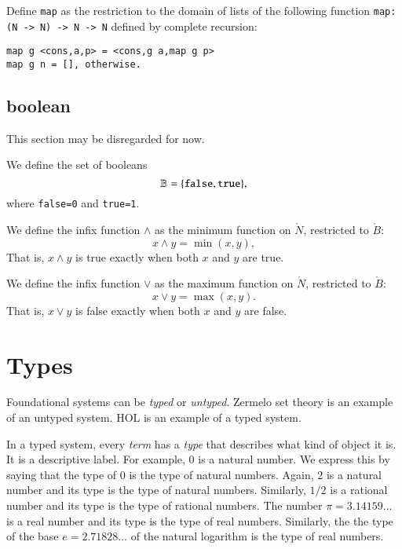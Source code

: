 \begin{example}  Define \verb!map! as the restriction to the domain of lists of the following function \verb!map:(N -> N) -> N -> N! defined by complete recursion:
\begin{verbatim}
map g <cons,a,p> = <cons,g a,map g p>
map g n = [], otherwise.
\end{verbatim}
\end{example}





\section{boolean}

\begin{note} This section may be disregarded for now.
\end{note}

We define the set of booleans
$$
\ring{B} = \{\verb!false!,\verb!true!\},
$$
where \verb!false=0! and \verb!true=1!.

We define the infix function $\land$ 
as the minimum function on $\ring{N}$, restricted to $\ring{B}$:
$$
x \land y = \min(x,y),
$$
That is, $x\land y$ is true exactly when both $x$ and $y$
are true.

We define the infix function $\lor$ as the maximum
function on $\ring{N}$, restricted to $\ring{B}$:
$$
x\lor y = \max(x,y).
$$
That is, $x\lor y$ is false exactly when both $x$ and $y$ are false.



\chapter{Types}

Foundational systems can be {\it typed} or {\it untyped}.  Zermelo set
theory is an example of an untyped system.  HOL is an example of a typed
system.

In a typed system, every  {\it term} has a {\it type} that describes
what kind of object it is.   It is a descriptive label.  For example, $0$ is a natural number.  We express this by saying that the type of $0$ is the type of natural numbers.  Again, $2$ is a natural number and its type is the type of natural numbers.  Similarly, $1/2$ is a rational number and its type is the type of rational numbers.  The number $\pi = 3.14159\ldots$ is a real number and its type is the type of real numbers.  Similarly, the the type of the base $e=2.71828\ldots$ of the natural logarithm is the type of real numbers.

